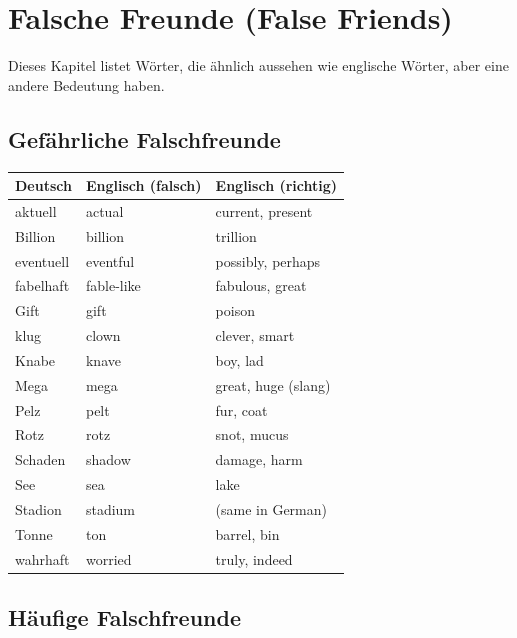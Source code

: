 \chapterend

\chapter{Falsche Freunde (False Friends)}
\label{cha:FalseFriends}

Dieses Kapitel listet Wörter, die ähnlich aussehen wie englische Wörter, aber eine andere Bedeutung haben.

\section{Gefährliche Falschfreunde}
\label{sec:GefaesslicheFF}

\bigskip
\begin{center}
\begin{tabular}{|l|p{5cm}|p{5cm}|}
\hline
Deutsch & Englisch (falsch) & Englisch (richtig) \\ \hline
aktuell & actual & current, present \\ \hline
Billion & billion & trillion \\ \hline
eventuell & eventful & possibly, perhaps \\ \hline
fabelhaft & fable-like & fabulous, great \\ \hline
Gift & gift & poison \\ \hline
klug & clown & clever, smart \\ \hline
Knabe & knave & boy, lad \\ \hline
Mega & mega & great, huge (slang) \\ \hline
Pelz & pelt & fur, coat \\ \hline
Rotz & rotz & snot, mucus \\ \hline
Schaden & shadow & damage, harm \\ \hline
See & sea & lake \\ \hline
Stadion & stadium & (same in German) \\ \hline
Tonne & ton & barrel, bin \\ \hline
wahrhaft & worried & truly, indeed \\ \hline
\end{tabular}
\end{center}

\section{Häufige Falschfreunde}
\label{sec:HaeufigFF}

